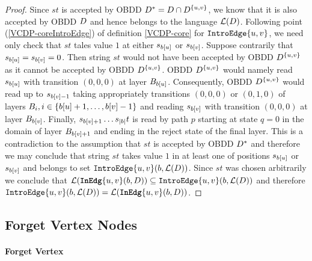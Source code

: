 \begin{proof}
    Since $st$ is accepted by OBDD $D^* = D \cap D^{\{u,v\}}$, we know that it is also accepted by OBDD $D$ and hence belongs to the language $\mathcal{L}(D)$. Following point (\ref{VCDP-coreIntroEdge}) of  definition \ref{VCDP-core} for $\texttt{IntroEdge}\{u,v\}$, we need only check that $st$ tales value $1$ at either $s_{b[u]}$ or $s_{b[v]}$. Suppose contrarily that $s_{b[u]} = s_{b[v]} = 0$. Then string $st$ would not have been accepted by OBDD $D^{\{u,v\}}$ as it cannot be accepted by OBDD $D^{\{u,v\}}$. OBDD $D^{\{u,v\}}$ would namely read $s_{b[u]}$ with transition $(0,0,0)$ at layer $B_{b[u]}$. Consequently, OBDD $D^{\{u,v\}}$ would read up to $s_{b[v] - 1}$ taking appropriately transitions $(0,0,0)$ or $(0,1,0)$ of layers $B_i, i \in \{b[u]+1,\ldots,b[v]-1\}$ and reading $s_{b[v]}$ with transition $(0,0,0)$ at layer $B_{b[v]}$. Finally, $s_{b[v]+1}\dots s_{|b|}t$ is read by path $p$ starting at state $q=0$ in the domain of layer $B_{b[v]+1}$ and ending in the reject state of the final layer. This is a contradiction to the assumption that $st$ is accepted by OBDD $D^*$ and therefore we may conclude that string $st$ takes value $1$ in at least one of positions $s_{b[u]}$ or $s_{b[v]}$ and belongs to set $\texttt{IntroEdge}\{u,v\}(b,\mathcal{L}(D))$. Since $st$ was chosen arbitrarily we conclude that $\mathcal{L}(\texttt{\textbf{InEdg}}\{u,v\}(b,D)) \subseteq \texttt{IntroEdge}\{u,v\}(b, \mathcal{L}(D))$ and therefore $\texttt{IntroEdge}\{u,v\}(b,\mathcal{L}(D)) = \mathcal{L}(\texttt{\textbf{InEdg}}\{u,v\}(b,D))$.
    
\end{proof}

\subsection{Forget Vertex Nodes} \label{subsec:FrgProof}

\paragraph*{Forget Vertex}

